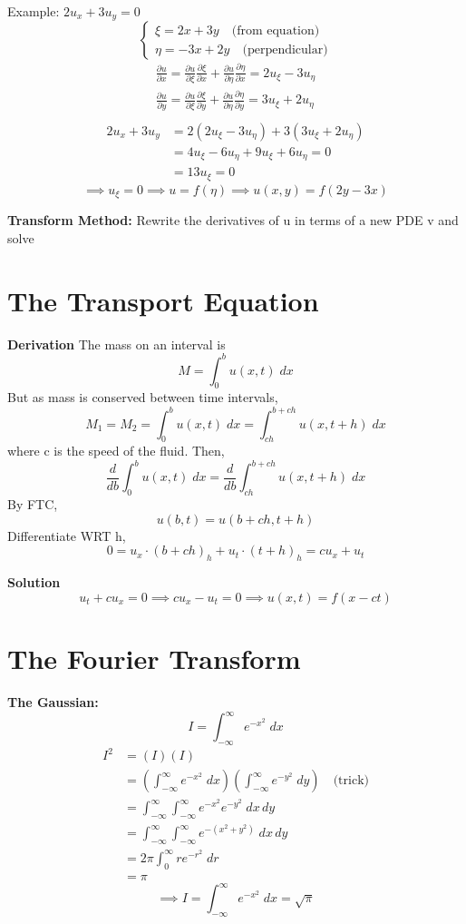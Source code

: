 \documentclass[12pt]{article}
\begin{document}
Example: $2u_x + 3u_y = 0$
\[\begin{cases}
    \xi = 2x  +3y \quad \text{(from equation)}\\
    \eta = -3x + 2y \quad \text{(perpendicular)}
\end{cases}\]
\begin{align*}
    \frac{\partial u}{\partial x} = \frac{\partial u}{\partial \xi}\frac{\partial \xi}{\partial x} + \frac{\partial u}{\partial \eta}\frac{\partial \eta}{\partial x} = 2u_\xi - 3u_\eta\\
    \frac{\partial u}{\partial y} = \frac{\partial u}{\partial \xi}\frac{\partial \xi}{\partial y} + \frac{\partial u}{\partial \eta}\frac{\partial \eta}{\partial y} = 3u_\xi + 2u_\eta\\
\end{align*}
\begin{align*}
    2u_x + 3u_y &= 2(2u_\xi - 3u_\eta) + 3(3u_\xi + 2u_\eta)\\
    &= 4u_\xi - 6u_\eta + 9u_\xi + 6u_\eta = 0\\
    &= 13u_\xi = 0
\end{align*}
\[\implies u_\xi = 0 \implies u = f(\eta) \implies u(x, y) = f(2y - 3x)\]

\textbf{Transform Method:} Rewrite the derivatives of u in terms of a new PDE v and solve 

\section*{The Transport Equation}
\textbf{Derivation}
The mass on an interval is 
\[M = \int_0^b u(x, t)\; dx\]
But as mass is conserved between time intervals, 
\[M_1 = M_2 = \int_0^b u(x, t)\; dx = \int_{ch}^{b + ch}u(x, t + h)\; dx\]
where c is the speed of the fluid. Then,
\[\frac{d}{db} \int_0^b u(x, t)\; dx = \frac{d}{db} \int_{ch}^{b+ch} u(x, t + h)\; dx\]
By FTC, 
\[u(b, t) = u(b + ch, t + h)\]
Differentiate WRT h, 
\[0 = u_x \cdot (b+ch)_h + u_t \cdot (t+h)_h = cu_x + u_t\]

\textbf{Solution}
\[u_t + cu_x = 0 \implies cu_x - u_t = 0 \implies u(x, t) = f(x -ct)\]

\section*{The Fourier Transform}
\textbf{The Gaussian:}
\[I = \int_{-\infty}^{\infty} e^{-x^2}\; dx\]
\begin{align*}
    I^2 &= (I)(I)\\
    &= \left(\int_{-\infty}^{\infty} e^{-x^2}\; dx\right)\left(\int_{-\infty}^{\infty} e^{-y^2}\; dy\right) \quad \text{(trick)}\\
    &= \int_{-\infty}^{\infty} \int_{-\infty}^{\infty} e^{-x^2} e^{-y^2}\; dx \, dy\\
    &= \int_{-\infty}^{\infty} \int_{-\infty}^{\infty} e^{-(x^2 + y^2)} \; dx \, dy\\
    &= 2\pi \int_{0}^{\infty} re^{-r^2}\; dr\\
    &= \pi
\end{align*}
\[\implies I = \int_{-\infty}^{\infty} e^{-x^2}\; dx = \sqrt{\pi}\]
\end{document}
